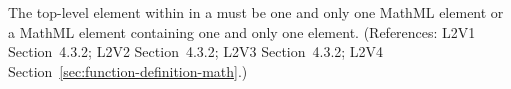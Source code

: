The top-level element within  in a \FunctionDefinition must be
one and only one MathML  element or a MathML
 element containing one and only one 
element.  (References: L2V1 Section~4.3.2; L2V2 Section~4.3.2;
L2V3 Section~4.3.2; L2V4 Section~\ref{sec:function-definition-math}.)
